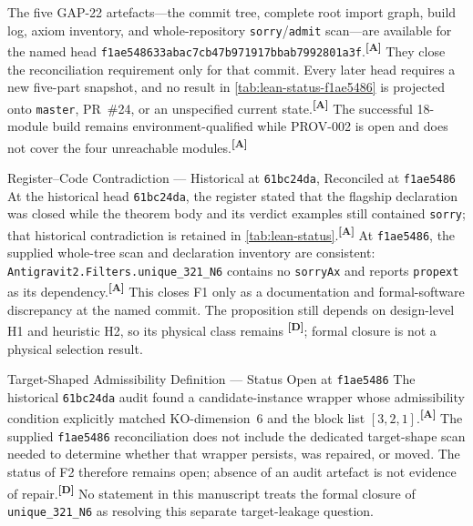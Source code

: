 \documentclass[12pt,a4paper,twoside]{article}
\theoremstyle{plain}
\theoremstyle{definition}
\theoremstyle{remark}
\newcommand{\catmark}[1]{\textsuperscript{\textsf{\textbf{[#1]}}}}
\begin{document}
\begin{governancebox}
The five GAP-22 artefacts---the commit tree, complete root import graph,
build log, axiom inventory, and whole-repository
\texttt{sorry}/\texttt{admit} scan---are available for the named head
\texttt{f1ae548633abac7cb47b971917bbab7992801a3f}.\catmark{A}
They close the reconciliation requirement only for that commit. Every later
head requires a new five-part snapshot, and no result in
\cref{tab:lean-status-f1ae5486} is projected onto \texttt{master}, PR~\#24,
or an unspecified current state.\catmark{A}
The successful 18-module build remains environment-qualified while PROV-002
is open and does not cover the four unreachable modules.\catmark{A}
\end{governancebox}

\begin{probbox}{Register--Code Contradiction --- Historical at \texttt{61bc24da}, Reconciled at \texttt{f1ae5486}}
At the historical head \texttt{61bc24da}, the register stated that the
flagship declaration was closed while the theorem body and its verdict
examples still contained \texttt{sorry}; that historical contradiction is
retained in \cref{tab:lean-status}.\catmark{A}
At \texttt{f1ae5486}, the supplied whole-tree scan and declaration inventory
are consistent: \texttt{Antigravit2.Filters.unique\_321\_N6} contains no
\texttt{sorryAx} and reports \texttt{propext} as its dependency.\catmark{A}
This closes F1 only as a documentation and formal-software discrepancy at the
named commit. The proposition still depends on design-level H1 and heuristic
H2, so its physical class remains \catmark{D}; formal closure is not a
physical selection result.
\end{probbox}

\begin{probbox}{Target-Shaped Admissibility Definition --- Status Open at \texttt{f1ae5486}}
The historical \texttt{61bc24da} audit found a candidate-instance wrapper
whose admissibility condition explicitly matched KO-dimension~6 and the block
list $[3,2,1]$.\catmark{A}
The supplied \texttt{f1ae5486} reconciliation does not include the dedicated
target-shape scan needed to determine whether that wrapper persists, was
repaired, or moved. The status of F2 therefore remains open; absence of an
audit artefact is not evidence of repair.\catmark{D}
No statement in this manuscript treats the formal closure of
\texttt{unique\_321\_N6} as resolving this separate target-leakage question.
\end{probbox}
\end{document}
